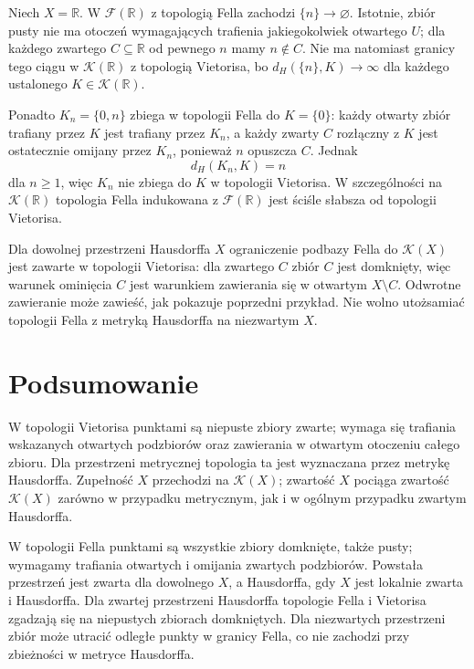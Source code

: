 \begin{przyklad}
\label{ex:topog21-escaping}
Niech \(X=\mathbb R\).
W \(\mathcal F(\mathbb R)\) z topologią Fella
zachodzi \(\{n\}\to\varnothing\).
Istotnie, zbiór pusty nie ma otoczeń wymagających
trafienia jakiegokolwiek otwartego \(U\);
dla każdego zwartego \(C\subseteq\mathbb R\)
od pewnego \(n\) mamy \(n\notin C\).
Nie ma natomiast granicy tego ciągu
w \(\mathcal K(\mathbb R)\) z topologią Vietorisa,
bo \(d_H(\{n\},K)\to\infty\)
dla każdego ustalonego \(K\in\mathcal K(\mathbb R)\).

Ponadto \(K_n=\{0,n\}\) zbiega w topologii Fella
do \(K=\{0\}\): każdy otwarty zbiór trafiany
przez \(K\) jest trafiany przez \(K_n\),
a każdy zwarty \(C\) rozłączny z \(K\)
jest ostatecznie omijany przez \(K_n\),
ponieważ \(n\) opuszcza \(C\).
Jednak
\[
 d_H(K_n,K)=n
\]
dla \(n\ge1\), więc \(K_n\) nie zbiega
do \(K\) w topologii Vietorisa.
W szczególności na \(\mathcal K(\mathbb R)\)
topologia Fella indukowana z \(\mathcal F(\mathbb R)\)
jest ściśle słabsza od topologii Vietorisa.
\end{przyklad}

\begin{uwaga}
\label{rem:topog21-restriction}
Dla dowolnej przestrzeni Hausdorffa \(X\)
ograniczenie podbazy Fella do \(\mathcal K(X)\)
jest zawarte w topologii Vietorisa:
dla zwartego \(C\) zbiór \(C\) jest domknięty,
więc warunek ominięcia \(C\) jest warunkiem
zawierania się w otwartym \(X\setminus C\).
Odwrotne zawieranie może zawieść,
jak pokazuje poprzedni przykład.
Nie wolno utożsamiać topologii Fella
z metryką Hausdorffa na niezwartym \(X\).
\end{uwaga}

\section{Podsumowanie}
\label{sec:topog21-summary}

W topologii Vietorisa punktami są niepuste
zbiory zwarte; wymaga się trafiania wskazanych
otwartych podzbiorów oraz zawierania w otwartym
otoczeniu całego zbioru. Dla przestrzeni metrycznej
topologia ta jest wyznaczana przez metrykę Hausdorffa.
Zupełność \(X\) przechodzi na \(\mathcal K(X)\);
zwartość \(X\) pociąga zwartość \(\mathcal K(X)\)
zarówno w przypadku metrycznym,
jak i w ogólnym przypadku zwartym Hausdorffa.

W topologii Fella punktami są wszystkie
zbiory domknięte, także pusty; wymagamy
trafiania otwartych i omijania zwartych
podzbiorów. Powstała przestrzeń jest zwarta
dla dowolnego \(X\), a Hausdorffa,
gdy \(X\) jest lokalnie zwarta i Hausdorffa.
Dla zwartej przestrzeni Hausdorffa
topologie Fella i Vietorisa zgadzają się
na niepustych zbiorach domkniętych.
Dla niezwartych przestrzeni zbiór może
utracić odległe punkty w granicy Fella,
co nie zachodzi przy zbieżności
w metryce Hausdorffa.